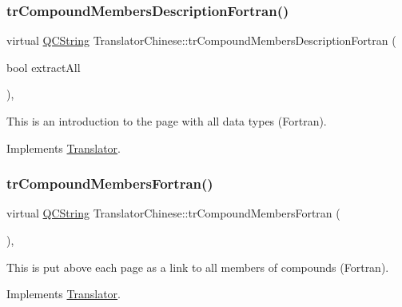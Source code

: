 \subsubsection{\texorpdfstring{trCompoundMembersDescriptionFortran()}{trCompoundMembersDescriptionFortran()}}
{\footnotesize\ttfamily virtual \mbox{\hyperlink{class_q_c_string}{Q\+C\+String}} Translator\+Chinese\+::tr\+Compound\+Members\+Description\+Fortran (\begin{DoxyParamCaption}\item[{bool}]{extract\+All }\end{DoxyParamCaption})\hspace{0.3cm}{\ttfamily [inline]}, {\ttfamily [virtual]}}

This is an introduction to the page with all data types (Fortran). 

Implements \mbox{\hyperlink{class_translator}{Translator}}.

\mbox{\label{class_translator_chinese_a954fa67b390e237996d34fe6819cd9d5}} 
\subsubsection{\texorpdfstring{trCompoundMembersFortran()}{trCompoundMembersFortran()}}
{\footnotesize\ttfamily virtual \mbox{\hyperlink{class_q_c_string}{Q\+C\+String}} Translator\+Chinese\+::tr\+Compound\+Members\+Fortran (\begin{DoxyParamCaption}{ }\end{DoxyParamCaption})\hspace{0.3cm}{\ttfamily [inline]}, {\ttfamily [virtual]}}

This is put above each page as a link to all members of compounds (Fortran). 

Implements \mbox{\hyperlink{class_translator}{Translator}}.

\mbox{\label{class_translator_chinese_a31f0f3d3861a8c43aadb9e55ee24048a}} 
